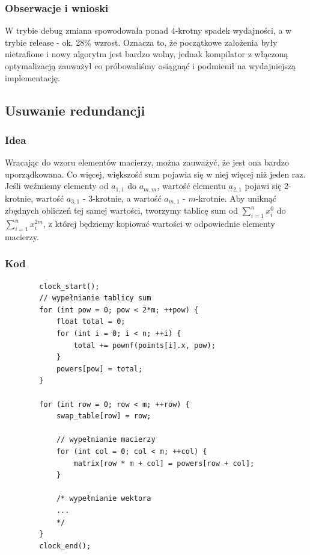 \documentclass{article}
\begin{document}
	\subsubsection{Obserwacje i wnioski}
	W trybie debug zmiana spowodowała ponad 4-krotny spadek wydajności, a w trybie release - ok. 28\% wzrost.
	Oznacza to, że początkowe założenia były nietrafione i nowy algorytm jest bardzo wolny, jednak kompilator z włączoną optymalizacją zauważył co próbowaliśmy osiągnąć i podmienił na wydajniejszą implementację.
	
	
	\pagebreak
	\subsection{Usuwanie redundancji}
	\subsubsection{Idea}
	Wracając do wzoru elementów macierzy, można zauważyć, że jest ona bardzo uporządkowana. Co więcej, większość sum pojawia się w niej więcej niż jeden raz. Jeśli weźmiemy elementy od $a_{1,1}$ do $a_{m,m}$, wartość elementu $a_{2,1}$ pojawi się 2-krotnie, wartość $a_{3,1}$ - 3-krotnie, a wartość $a_{m,1}$ - $m$-krotnie. Aby uniknąć zbędnych obliczeń tej samej wartości, tworzymy tablicę sum od $\sum_{i=1}^{n}x_i^0$ do $\sum_{i=1}^{n}x_i^{2m}$, z której będziemy kopiować wartości w odpowiednie elementy macierzy.
	
	\subsubsection{Kod}
	\begin{verbatim}
		clock_start();
		// wypełnianie tablicy sum
		for (int pow = 0; pow < 2*m; ++pow) {
			float total = 0;
			for (int i = 0; i < n; ++i) {
				total += pownf(points[i].x, pow);
			}
			powers[pow] = total;
		}
		
		for (int row = 0; row < m; ++row) {
			swap_table[row] = row;
			
			// wypełnianie macierzy
			for (int col = 0; col < m; ++col) {
				matrix[row * m + col] = powers[row + col];
			}
			
			/* wypełnianie wektora
			...
			*/
		}
		clock_end();
	\end{verbatim}
	
\end{document}
